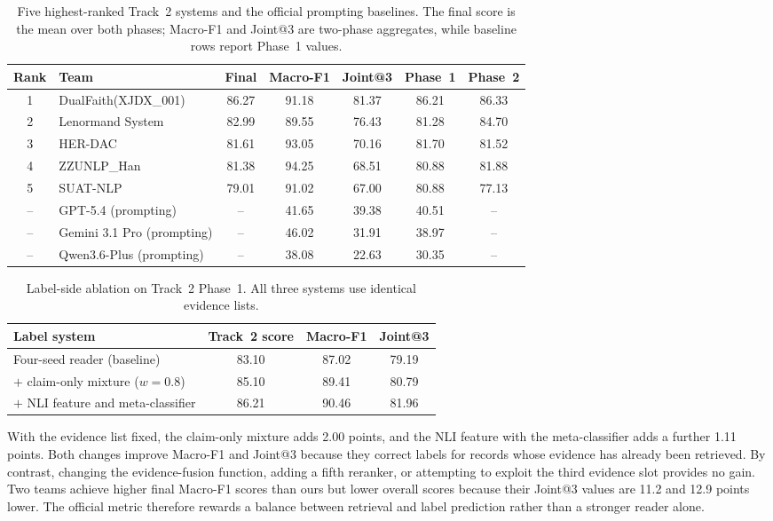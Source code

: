 \documentclass[runningheads]{llncs}
\makeatletter
\newcommand{\sys}{XJDX\_001}
\newcommand{\method}{DualFaith}
\newcommand{\mf}{Macro-F1}
\newcommand{\joint}{Joint@3}
\newcommand{\best}[1]{#1}
\makeatother
\begin{document}
\begin{table}[H]
\centering
\caption{Five highest-ranked Track~2 systems and the official prompting
baselines. The final score is the mean over both phases; \mf{} and \joint{}
are two-phase aggregates, while baseline rows report Phase~1 values.}
\label{tab:t2-final}
\small
\begin{tabular}{clccccc}
\toprule
Rank & Team & Final & \mf{} & \joint{} & Phase~1 & Phase~2\\
\midrule
1 & \method{}(\sys{}) & \best{86.27} & 91.18 & \best{81.37} & \best{86.21} & \best{86.33}\\
2 & Lenormand System & 82.99 & 89.55 & 76.43 & 81.28 & 84.70\\
3 & HER-DAC & 81.61 & 93.05 & 70.16 & 81.70 & 81.52\\
4 & ZZUNLP\_Han & 81.38 & \best{94.25} & 68.51 & 80.88 & 81.88\\
5 & SUAT-NLP & 79.01 & 91.02 & 67.00 & 80.88 & 77.13\\
\midrule
-- & GPT-5.4 (prompting) & -- & 41.65 & 39.38 & 40.51 & --\\
-- & Gemini 3.1 Pro (prompting) & -- & 46.02 & 31.91 & 38.97 & --\\
-- & Qwen3.6-Plus (prompting) & -- & 38.08 & 22.63 & 30.35 & --\\
\bottomrule
\end{tabular}
\end{table}

\begin{table}[H]
\centering
\caption{Label-side ablation on Track~2 Phase~1. All three systems use identical evidence lists.}
\label{tab:t2-ablation}
\small
\begin{tabular}{lccc}
\toprule
Label system & Track~2 score & \mf{} & \joint{}\\
\midrule
Four-seed reader (baseline) & 83.10 & 87.02 & 79.19\\
$+$ claim-only mixture ($w=0.8$) & 85.10 & 89.41 & 80.79\\
$+$ NLI feature and meta-classifier & \best{86.21} & \best{90.46} & \best{81.96}\\
\bottomrule
\end{tabular}
\end{table}

With the evidence list fixed, the claim-only mixture adds 2.00 points, and the NLI feature with the meta-classifier adds a further 1.11 points. Both changes improve \mf{} and \joint{} because they correct labels for records whose evidence has already been retrieved. By contrast, changing the evidence-fusion function, adding a fifth reranker, or attempting to exploit the third evidence slot provides no gain. Two teams achieve higher final \mf{} scores than ours but lower overall scores because their \joint{} values are 11.2 and 12.9 points lower. The official metric therefore rewards a balance between retrieval and label prediction rather than a stronger reader alone.
\end{document}
